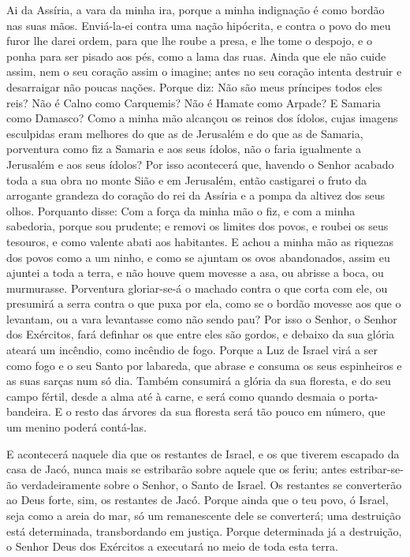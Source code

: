 Ai da Assíria, a vara da minha ira, porque a minha indignação é
como bordão nas suas mãos. Enviá-la-ei contra uma nação
hipócrita, e contra o povo do meu furor lhe darei ordem, para que
lhe roube a presa, e lhe tome o despojo, e o ponha para ser pisado
aos pés, como a lama das ruas. Ainda que ele não cuide assim,
nem o seu coração assim o imagine; antes no seu coração intenta
destruir e desarraigar não poucas nações. Porque diz: Não são
meus príncipes todos eles reis? Não é Calno como Carquemis? Não
é Hamate como Arpade? E Samaria como Damasco? Como a minha
mão alcançou os reinos dos ídolos, cujas imagens esculpidas eram
melhores do que as de Jerusalém e do que as de Samaria,
porventura como fiz a Samaria e aos seus ídolos, não o faria
igualmente a Jerusalém e aos seus ídolos? Por isso acontecerá
que, havendo o Senhor acabado toda a sua obra no monte Sião e em
Jerusalém, então castigarei o fruto da arrogante grandeza do coração
do rei da Assíria e a pompa da altivez dos seus olhos.
Porquanto disse: Com a força da minha mão o fiz, e com a
minha sabedoria, porque sou prudente; e removi os limites dos povos,
e roubei os seus tesouros, e como valente abati aos habitantes.
E achou a minha mão as riquezas dos povos como a um ninho, e
como se ajuntam os ovos abandonados, assim eu ajuntei a toda a
terra, e não houve quem movesse a asa, ou abrisse a boca, ou
murmurasse. Porventura gloriar-se-á o machado contra o que
corta com ele, ou presumirá a serra contra o que puxa por ela, como
se o bordão movesse aos que o levantam, ou a vara levantasse como
não sendo pau? Por isso o Senhor, o Senhor dos Exércitos,
fará definhar os que entre eles são gordos, e debaixo da sua glória
ateará um incêndio, como incêndio de fogo. Porque a Luz de
Israel virá a ser como fogo e o seu Santo por labareda, que abrase e
consuma os seus espinheiros e as suas sarças num só dia.
Também consumirá a glória da sua floresta, e do seu campo
fértil, desde a alma até à carne, e será como quando desmaia o
porta-bandeira. E o resto das árvores da sua floresta será
tão pouco em número, que um menino poderá contá-las.

E acontecerá naquele dia que os restantes de Israel, e os que
tiverem escapado da casa de Jacó, nunca mais se estribarão sobre
aquele que os feriu; antes estribar-se-ão verdadeiramente sobre o
Senhor, o Santo de Israel. Os restantes se converterão ao
Deus forte, sim, os restantes de Jacó. Porque ainda que o teu
povo, ó Israel, seja como a areia do mar, só um remanescente dele se
converterá; uma destruição está determinada, transbordando em
justiça. Porque determinada já a destruição, o Senhor Deus
dos Exércitos a executará no meio de toda esta terra.

